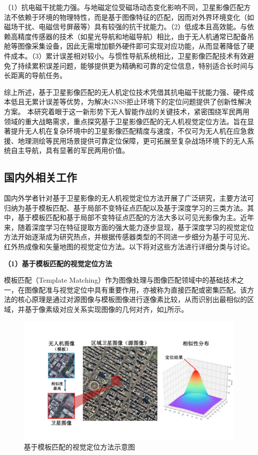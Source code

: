\documentclass[12pt]{article}
\begin{document}
（1）抗电磁干扰能力强。与地磁定位受磁场动态变化影响不同，卫星影像匹配方法不依赖于环境的物理特性，而是基于图像特征的匹配，因而对外界环境变化（如磁场干扰、电磁信号屏蔽等）具有较强的抗干扰能力。（2）低成本且高效能。与依赖高精度传感器的技术（如星光导航和地磁导航）相比，由于无人机通常已配备吊舱等图像采集设备，因此无需增加额外硬件即可实现对应功能，从而显著降低了硬件成本。（3）累计误差相对较小。与惯性导航系统相比，卫星影像匹配技术有效避免了持续累积误差问题，能够提供更为精确和可靠的定位信息，特别适合长时间与长距离的导航任务。

综上所述，基于卫星影像匹配的无人机定位技术凭借其抗电磁干扰能力强、硬件成本低且无累计误差等优势，为解决GNSS拒止环境下的定位问题提供了创新性解决方案。
本研究着眼于这一新形势下无人智能作战的关键技术，紧密围绕军民两用领域的重大战略需求，重点探究基于卫星影像匹配的无人机视觉定位方法。旨在显著提升无人机在复杂环境中的卫星影像匹配精度与速度，不仅可为无人机在应急救援、地理测绘等民用场景提供可靠定位保障，更可拓展至复杂战场环境下的无人系统自主导航，具有显著的军民两用价值。


\subsection{国内外相关工作}

国内外学者针对基于卫星影像的无人机视觉定位方法开展了广泛研究，主要方法可归纳为基于模板匹配、基于局部不变特征点匹配以及基于深度学习的三类方法。其中，基于模板匹配和基于局部不变特征点匹配的方法大多以可见光影像为主。近年来，随着深度学习在特征提取方面的强大能力逐步显现，基于深度学习的视觉定位方法开始逐渐成为研究热点，并根据传感器类型的不同进一步细分为基于可见光、红外热成像和矢量地图的视觉定位方法。以下将对这些方法进行详细分类与讨论。

\textbf{（1）基于模板匹配的视觉定位方法}

模板匹配（Template Matching）作为图像处理与图像匹配领域中的基础技术之一，在图像配准与视觉定位中具有重要作用，亦被称为直接匹配或密集匹配。该方法的核心原理是通过对源图像与模板图像进行逐像素比较，从而识别出最相似的区域，并基于像素级对应关系实现图像的几何对齐，如\cref{relatedwork_image3}所示。



 \begin{figure}[H]
  \centering
  \includegraphics[width=0.9\linewidth]{figures/relatedwork/基于模版匹配的定位方法.pdf}
  \caption{基于模板匹配的视觉定位方法示意图}
  \label{relatedwork_image3}
\end{figure}
\end{document}
